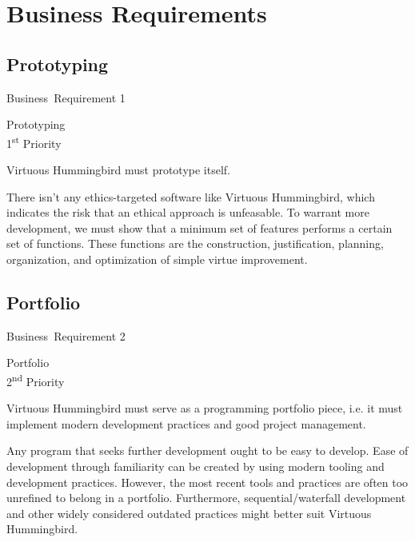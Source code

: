\documentclass{article}
\newcommand{\requirementname}{Undefined}
\newcommand{\requirementlabel}{undefined}
\newcommand{\setreqtype}[2]
    {
        \renewcommand{\requirementname}{#1}
        \renewcommand{\requirementlabel}{#2}
    }
\newenvironment{requirement}[2][]
    {
        \begin{mdframed}
        \label{\requirementlabel-#2}
        \vspace{2.5mm}
        \begin{center}
            {
                \large
                \requirementname\ Requirement #2
            
                #1
            }
        \end{center}
        \vspace{2.5mm}
    }
    {
        \end{mdframed}
    }
\begin{document}
\section{Business Requirements}

\begin{landscape}
    \begin{figure}
    \centering
    \def\svgwidth{\columnwidth}
    
    \end{figure}
\end{landscape}

\setreqtype{Business}{business}

\subsection{Prototyping}

\begin{requirement}[Prototyping \\ 1\textsuperscript{st} Priority]{1}
    Virtuous Hummingbird must prototype itself.
\end{requirement}

There isn't any ethics-targeted software like Virtuous Hummingbird, which indicates the risk that an ethical approach is unfeasable.
To warrant more development, we must show that a minimum set of features performs a certain set of functions.
These functions are the construction, justification, planning, organization, and optimization of simple virtue improvement.

\subsection{Portfolio}

\begin{requirement}[Portfolio \\ 2\textsuperscript{nd} Priority]{2}
    Virtuous Hummingbird must serve as a programming portfolio piece, i.e. it must implement modern development practices and good project management.
\end{requirement}

Any program that seeks further development ought to be easy to develop.
Ease of development through familiarity can be created by using modern tooling and development practices.
However, the most recent tools and practices are often too unrefined to belong in a portfolio.
Furthermore, sequential/waterfall development and other widely considered outdated practices might better suit Virtuous Hummingbird.
\end{document}
